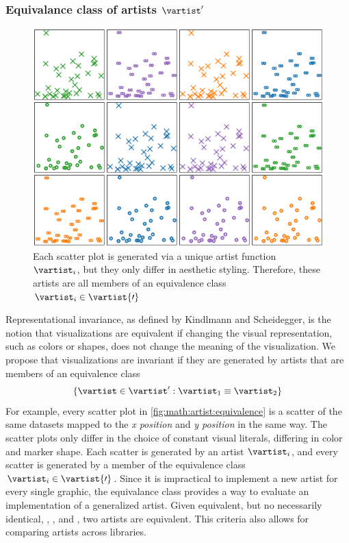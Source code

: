\documentclass[../main.tex]{subfiles}
\begin{document}
\subsubsection{Equivalance class of artists $\vartist^{\prime}$}
\label{sec:artist_equivalance}
\begin{figure}[H]
    \includegraphics[width=1\textwidth]{figures/math/equivalent_artists.png}
   \caption{Each scatter plot is generated via a unique artist function $\vartist_{i}$, but they only differ in aesthetic styling. Therefore, these artists are all members of an equivalence class $\vartist_{i} \in \vartist{\prime}$}
    \label{fig:math:artist:equivalence}
\end{figure}
Representational invariance, as defined by Kindlmann and Scheidegger, is the notion that visualizations are equivalent if changing the visual representation, such as colors or shapes, does not change the meaning of the visualization\cite{kindlmannAlgebraicProcessVisualization2014}. We propose that visualizations are invariant if they are generated by artists that are members of an equivalence class 
\begin{equation*}
\{\vartist \in \vartist^{\prime}: \vartist_{1} \equiv \vartist_{2}\}
\end{equation*}
For example, every scatter plot in \autoref{fig:math:artist:equivalence} is a scatter of the same datasets mapped to the \textit{x position} and \textit{y position} in the same way. The scatter plots only differ in the choice of constant visual literals, differing in color and marker shape. Each scatter is generated by an artist $\vartist_{i}$, and every scatter is generated by a member of the equivalence class $\vartist_{i} \in \vartist{\prime}$. Since it is impractical to implement a new artist for every single graphic, the equivalance class provides a way to evaluate an implementation of a generalized artist. Given equivalent, but no necessarily identical, \vchannel, \vmark, and \vindex, two artists are equivalent. This criteria also allows for comparing artists across libraries. 
\end{document}
